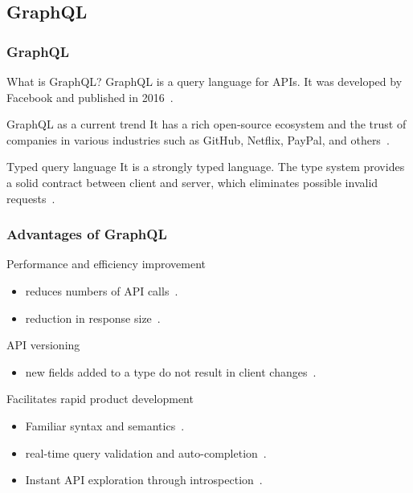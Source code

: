 \subsection{GraphQL}

\begin{frame}\frametitle{GraphQL}

  \begin{block}{What is GraphQL?}
    GraphQL is a query language for APIs. It was developed by Facebook and published in 2016~\cite{initial-analysis-of-gql,gql-spec}. 
  \end{block}

  \begin{block}{GraphQL as a current trend}
    It has a rich open-source ecosystem and the trust of companies in various industries such as GitHub, Netflix, PayPal, and others~\cite{morph-gql-1}.
  \end{block}

\begin{block}{Typed query language}
  It is a strongly typed language. The type system provides a solid contract between client and server, which eliminates possible invalid requests~\cite{real-time-sys-arc-based-on-gql}.
\end{block}

\end{frame}

\begin{frame}\frametitle{Advantages of GraphQL}

\begin{block}{Performance and efficiency improvement}
\begin{itemize}
  \item reduces numbers of API calls~\cite{migrating-to-gql}.
  \item reduction in response size~\cite{migrating-to-gql}.
\end{itemize}
\end{block}

\begin{block}{API versioning}
\begin{itemize}
  \item new fields added to a type do not result in client changes~\cite{migrating-to-gql}. 
\end{itemize}

\end{block}

\begin{block}{Facilitates rapid product development}
\begin{itemize}
  \item  Familiar syntax and semantics~\cite{rest-vs-gql-controlled-experiment}.
  \item real-time query validation and auto-completion~\cite{rest-vs-gql-controlled-experiment,migrating-to-gql}.
  \item Instant API exploration through introspection~\cite{migrating-to-gql}. 
\end{itemize}

\end{block}

\end{frame}

